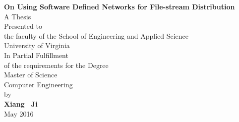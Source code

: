 \thispagestyle{empty}

\mbox{}
\vskip1in

\begin{center}

{
{\Large
\textbf{
On Using Software Defined Networks for File-stream Distribution 
}}
\\[20pt]
A Thesis\\
Presented to\\
the faculty of the School of Engineering and Applied Science \\
University of Virginia\\[20pt]
In Partial Fulfillment\\
of the requirements for the Degree\\
Master of Science\\
Computer Engineering\\[20pt]
by\\[20pt]
{\large\bf Xiang \ Ji} \\[11pt]
May 2016 }

\end{center}
